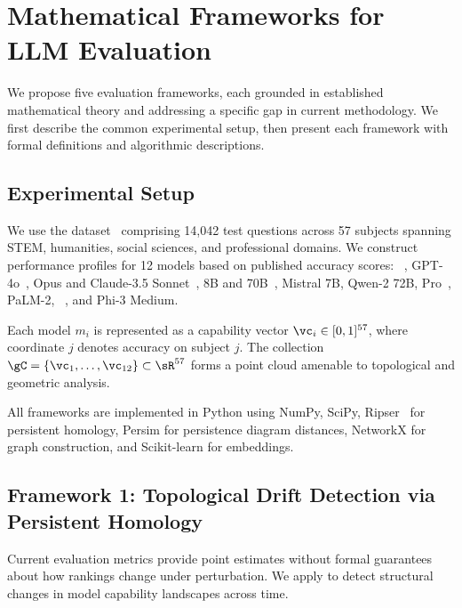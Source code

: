 \section{Mathematical Frameworks for LLM Evaluation}
\label{sec:method}

We propose five evaluation frameworks, each grounded in established mathematical theory and addressing a specific gap in current methodology.
We first describe the common experimental setup, then present each framework with formal definitions and algorithmic descriptions.

\subsection{Experimental Setup}
\label{sec:setup}

We use the \mmlu dataset~\citep{hendrycks2021mmlu} comprising 14,042 test questions across 57 subjects spanning STEM, humanities, social sciences, and professional domains.
We construct performance profiles for 12 models based on published accuracy scores: \gpt~\citep{openai2023gpt4}, GPT-4o~\citep{openai2024o1}, \claude Opus and Claude-3.5 Sonnet~\citep{anthropic2024claude3}, \llama 8B and 70B~\citep{dubey2024llama3}, Mistral 7B, Qwen-2 72B,  Pro~\citep{geminiteam2024gemini15}, PaLM-2, \mixtral~\citep{jiang2024mixtral}, and Phi-3 Medium.

Each model $m_i$ is represented as a capability vector $\vc_i \in [0,1]^{57}$, where coordinate $j$ denotes accuracy on subject $j$.
The collection $\gC = \{\vc_1, \ldots, \vc_{12}\} \subset \sR^{57}$ forms a point cloud amenable to topological and geometric analysis.

All frameworks are implemented in Python using NumPy, SciPy, Ripser~\citep{bauer2021ripser} for persistent homology, Persim for persistence diagram distances, NetworkX for graph construction, and Scikit-learn for embeddings.

\subsection{Framework 1: Topological Drift Detection via Persistent Homology}
\label{sec:topdrift}

Current evaluation metrics provide point estimates without formal guarantees about how rankings change under perturbation.
We apply \ph to detect structural changes in model capability landscapes across time.

